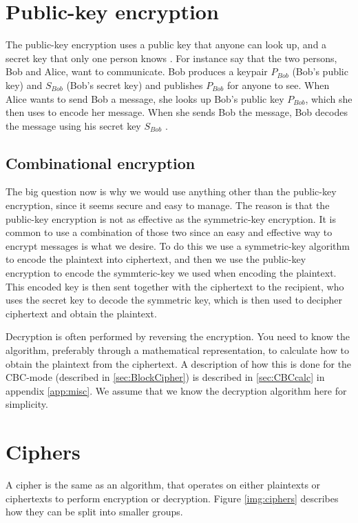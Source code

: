 \section{Public-key encryption}
The public-key encryption uses a public key that anyone can look up, and a 
secret key that only one person knows \citep[pp. 25--32]{Simmons:1992}.
For instance say that the two persons, Bob and Alice, want to communicate. 
Bob produces a keypair \(P_{Bob}\) (Bob’s public key) and \(S_{Bob}\) 
(Bob’s secret key) and publishes \(P_{Bob}\) for anyone to see. When Alice wants 
to send Bob a message, she looks up Bob’s public key \(P_{Bob}\), which she then 
uses to encode her message. When she sends Bob the message, Bob decodes the 
message using his secret key \(S_{Bob}\) \citep{Schneier:2003}.

\subsection{Combinational encryption}
The big question now is why we would use anything other than the public-key
encryption, since it seems secure and easy to manage. The reason is that the 
public-key encryption is not as effective as the symmetric-key encryption. 
It is common to use a combination of those two since an easy and effective way 
to encrypt messages is what we desire. To do this we use a symmetric-key 
algorithm to encode the plaintext into ciphertext, and then we use the 
public-key encryption to encode the symmteric-key we used when encoding the 
plaintext. This encoded key is then sent together with the ciphertext to the 
recipient, who uses the secret key to decode the symmetric key, which is then used to decipher ciphertext and obtain the plaintext.

Decryption is often performed by reversing the encryption. You need to know the 
algorithm, preferably through a mathematical representation, to calculate how 
to obtain the plaintext from the ciphertext. A description of how this is done 
for the CBC-mode (described in \ref{sec:BlockCipher}) is described in 
\ref{sec:CBCcalc} in appendix \ref{app:misc}. We assume that we know the 
decryption algorithm here for simplicity. 

\section{Ciphers}
A cipher is the same as an algorithm, that operates on either plaintexts or 
ciphertexts to perform encryption or decryption. Figure \ref{img:ciphers} 
describes how they can be split into smaller groups.

